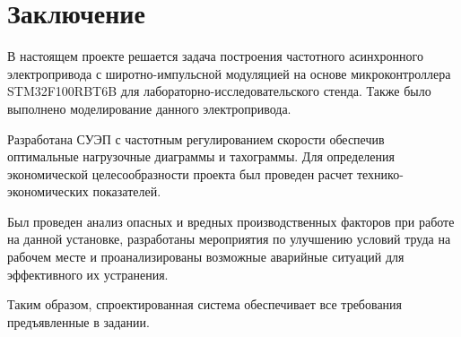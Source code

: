 \section*{Заключение}
        В настоящем проекте решается задача построения частотного асинхронного
        электропривода с широтно-импульсной модуляцией на основе
        микроконтроллера STM32F100RBT6B для лабораторно-исследовательского
        стенда. Также было выполнено моделирование данного электропривода.

        Разработана СУЭП с частотным регулированием скорости обеспечив
        оптимальные нагрузочные диаграммы и тахограммы. Для определения
        экономической целесообразности проекта был проведен расчет
        технико-экономических показателей.

        Был проведен анализ опасных и вредных производственных факторов при
        работе на данной установке, разработаны мероприятия по улучшению
        условий труда на рабочем месте и проанализированы возможные аварийные
        ситуаций для эффективного их устранения.

        Таким образом, спроектированная система обеспечивает все требования
        предъявленные в задании. 
